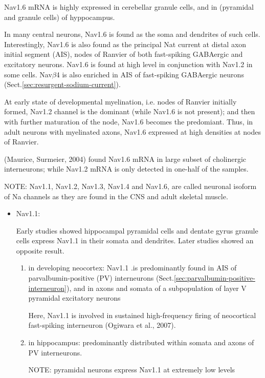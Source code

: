 \begin{enumerate}
Nav1.6 mRNA is highly expressed in cerebellar granule cells, and in (pyramidal
and granule cells) of hyppocampus. 

In many central neurons, Nav1.6 is found as the soma and dendrites of such
cells. Interestingly, Nav1.6 is also found as the principal Nat current at
distal axon initial segment (AIS), nodes of Ranvier of both fast-spiking
GABAergic and excitatory neurons. Nav1.6 is found at high level in conjunction
with Nav1.2 in some cells. Nav$\beta$4 is also enriched in AIS of fast-spiking
GABAergic neurons (Sect.\ref{sec:resurgent-sodium-current}).

At early state of developmental myelination, i.e. nodes of Ranvier initially
formed, Nav1.2 channel is the dominant (while Nav1.6 is not present); and then
with further maturation of the node, Nav1.6 becomes the predomiant. Thus, in
adult neurons with myelinated axons, Nav1.6 expressed at high densities at nodes
of Ranvier.

(Maurice, Surmeier, 2004) found Nav1.6 mRNA in large subset of cholinergic
interneurons; while Nav1.2 mRNA is only detected in one-half of the samples.

  
\end{enumerate}

NOTE: Nav1.1, Nav1.2, Nav1.3, Nav1.4 and Nav1.6, are called neuronal isoform
of Na channels as they are found in the CNS and adult skeletal muscle.


\begin{itemize}
  \item Nav1.1:
  
Early studies showed hippocampal  pyramidal cells  and  dentate  gyrus granule
cells  express  Nav1.1  in  their somata and dendrites. Later studies showed an
opposite result.
   \begin{enumerate}
     
     \item in developing neocortex: Nav1.1 .is predominantly found in AIS of
     parvalbumin-positive (PV) interneurons
     (Sect.\ref{sec:parvalbumin-positive-interneuron}), and in axons and somata
     of a subpopulation of layer V pyramidal excitatory neurons

Here, Nav1.1 is involved in sustained high-frequency firing of neocortical
fast-spiking interneuron (Ogiwara et al., 2007).

     \item in hippocampus: predominantly distributed within somata and axons of
     PV interneurons.

NOTE:  pyramidal neurons express Nav1.1 at extremely low levels
   \end{enumerate}

\end{itemize}

